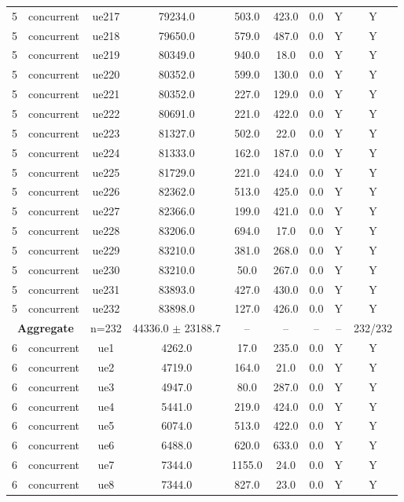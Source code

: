 \begin{table}[ht]
\begin{tabular}{|c|c|c|c|c|c|c|c|c|}
5 & concurrent & ue217 & 79234.0 & 503.0 & 423.0 & 0.0 & Y & Y \\
5 & concurrent & ue218 & 79650.0 & 579.0 & 487.0 & 0.0 & Y & Y \\
5 & concurrent & ue219 & 80349.0 & 940.0 & 18.0 & 0.0 & Y & Y \\
5 & concurrent & ue220 & 80352.0 & 599.0 & 130.0 & 0.0 & Y & Y \\
5 & concurrent & ue221 & 80352.0 & 227.0 & 129.0 & 0.0 & Y & Y \\
5 & concurrent & ue222 & 80691.0 & 221.0 & 422.0 & 0.0 & Y & Y \\
5 & concurrent & ue223 & 81327.0 & 502.0 & 22.0 & 0.0 & Y & Y \\
5 & concurrent & ue224 & 81333.0 & 162.0 & 187.0 & 0.0 & Y & Y \\
5 & concurrent & ue225 & 81729.0 & 221.0 & 424.0 & 0.0 & Y & Y \\
5 & concurrent & ue226 & 82362.0 & 513.0 & 425.0 & 0.0 & Y & Y \\
5 & concurrent & ue227 & 82366.0 & 199.0 & 421.0 & 0.0 & Y & Y \\
5 & concurrent & ue228 & 83206.0 & 694.0 & 17.0 & 0.0 & Y & Y \\
5 & concurrent & ue229 & 83210.0 & 381.0 & 268.0 & 0.0 & Y & Y \\
5 & concurrent & ue230 & 83210.0 & 50.0 & 267.0 & 0.0 & Y & Y \\
5 & concurrent & ue231 & 83893.0 & 427.0 & 430.0 & 0.0 & Y & Y \\
5 & concurrent & ue232 & 83898.0 & 127.0 & 426.0 & 0.0 & Y & Y \\
\multicolumn{2}{|c|}{\textbf{Aggregate}} & n=232 & 44336.0 $\pm$ 23188.7 & -- & -- & -- & -- & 232/232 \\
\hline
6 & concurrent & ue1 & 4262.0 & 17.0 & 235.0 & 0.0 & Y & Y \\
6 & concurrent & ue2 & 4719.0 & 164.0 & 21.0 & 0.0 & Y & Y \\
6 & concurrent & ue3 & 4947.0 & 80.0 & 287.0 & 0.0 & Y & Y \\
6 & concurrent & ue4 & 5441.0 & 219.0 & 424.0 & 0.0 & Y & Y \\
6 & concurrent & ue5 & 6074.0 & 513.0 & 422.0 & 0.0 & Y & Y \\
6 & concurrent & ue6 & 6488.0 & 620.0 & 633.0 & 0.0 & Y & Y \\
6 & concurrent & ue7 & 7344.0 & 1155.0 & 24.0 & 0.0 & Y & Y \\
6 & concurrent & ue8 & 7344.0 & 827.0 & 23.0 & 0.0 & Y & Y \\

\end{tabular}
\end{table}
